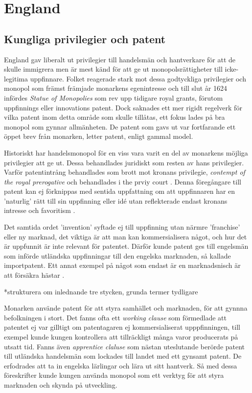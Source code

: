 \section{England} 

\subsection{Kungliga privilegier och patent} 

England gav liberalt ut privilegier till handelsmän och hantverkare för att de skulle immigrera men är
mest känd för att ge ut monopolsrättigheter till icke-legitima uppfinnare. Folket reagerade stark mot
dessa godtyckliga privilegier och monopol som främst främjade monarkens egenintresse och till slut år 1624 infördes
\emph{Statue of Monopolies} som rev upp tidigare royal grants, förutom uppfinnings eller innovations patent.
Dock saknades ett mer rigidt regelverk för vilka patent inom detta område som skulle tillåtas, ett fokus
lades på bra monopol som gynnar allmänheten. De patent som gavs ut var fortfarande ett öppet brev från
monarken, letter patent, enligt gammal model.

Historiskt har handelsmonopol för en viss vara 
varit en del av monarkens möjliga privilegier att ge ut. Dessa behandlades
juridiskt som resten av hans privilegier. Varför patentintrång
behandlades som brott mot kronans privilegie, \emph{contempt of the royal prerogative} och behandlades i the prviy court \cite{macleod}. Denna
föregångare till patent kan ej förknippas med sentida uppfattning om att uppfinnaren har en 'naturlig' rätt till sin uppfinning eller idé
utan reflekterade endast kronans intresse och favoritism \cite{bracha}.

Det samtida ordet 'invention' syftade ej till uppfinning utan närmre 'franchise' eller ny marknad, det
viktiga är att man kan kommersialisera något, och hur det är uppfunnit är inte relevant för patentet\cite{bracha}.
Därför kunde patent ges till engelsmän som införde utländska uppfinningar till den engelska marknaden, så kallade importpatent.
Ett annat exempel på något som endast är en marknadsnisch är att försäkra hästar \cite{davies}.


*strukturera om inlednande tre stycken, grunda termer tydligare

Monarken använde patent för att styra samhället och marknaden, för att gynnna befolkningen i stort. Det fanns ofta ett \emph{working clause} som förmedlade att patentet ej var
gilltigt om patentagaren ej kommersialiserat upppfinningen, till exempel kunde kungen kontrollera att
tillräckligt många varor producerats på utsatt tid. Fanns även \emph{apprentice claluse} som nästan
uteslutande berörde patent till utländska handelsmän som lockades till landet med ett gynsamt patent. De erfodrades att ta in engelska lärlingar och
lära ut sitt hantverk. Så med dessa föreskrifter kunde kungen använda monopol som ett verktyg för att styra marknaden och skynda på utveckling.\cite{bracha}

